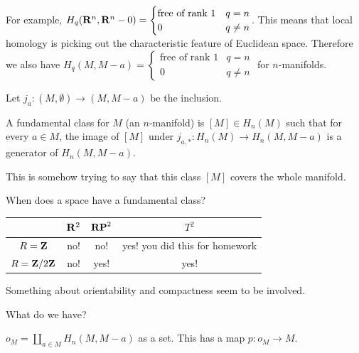 For example, $H_q(\mathbf R^n,\mathbf R^n-0)=\begin{cases}\text{free of rank }1 & q=n \\ 0 & q\neq n\end{cases}$. This means that local homology is picking out the characteristic feature of Euclidean space. Therefore we also have $H_q(M,M-a)=\begin{cases}\text{free of rank }1 & q=n \\ 0 & q\neq n\end{cases}$ for $n$-manifolds.
\begin{notation}
Let $j_a:(M,\emptyset)\to (M,M-a)$ be the inclusion.
\end{notation}
\begin{definition}
A fundamental class for $M$ (an $n$-manifold) is $[M]\in H_n(M)$ such that for every $a\in M$, the image of $[M]$ under $j_{a,\ast}:H_n(M)\to H_n(M,M-a)$ is a generator of $H_n(M,M-a)$.
\end{definition}
This is somehow trying to say that this class $[M]$ covers the whole manifold.
\begin{example}
When does a space have a fundamental class?
\begin{center}
\begin{tabular}{c|c c c } 
 \hline
  & $\mathbf R^2$ & $\mathbf{RP}^2$ & $T^2$ \\ 
  \hline
 $R=\mathbf Z$ & no! & no! & yes! you did this for homework \\
 $R=\mathbf Z/2\mathbf Z$ & no! & yes! & yes!
\end{tabular}
\end{center}
Something about orientability and compactness seem to be involved.
\end{example}
What do we have? 
\begin{definition}
$o_M=\coprod_{a\in M}H_n(M,M-a)$ as a set. This has a map $p:o_M\to M$.
\end{definition}
